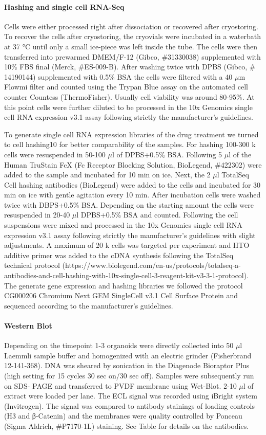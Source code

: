 \paragraph{Hashing and single cell RNA-Seq}
Cells were either processed right after dissociation or recovered after cryostoring.  To recover the cells after cryostoring, the cryovials were incubated in a waterbath at 37 °C until only a small ice-piece was left inside the tube. The cells were then transferred into prewarmed DMEM/F-12 (Gibco, \#31330038) supplemented with 10\% FBS final (Merck, \#ES-009-B). After washing twice with DPBS (Gibco, \# 14190144) supplemented with 0.5\% BSA the cells were filtered with a 40 $\mu$m Flowmi filter and counted using the Trypan Blue assay on the automated cell counter Countess (ThermoFisher). Usually cell viability was around 80-95\%. At this point cells were further diluted to be processed in the 10x Genomics single cell RNA expression v3.1 assay following strictly the manufacturer's guidelines.

To generate single cell RNA expression libraries of the drug treatment we turned to cell hashing10 for better comparability of the samples. For hashing 100-300 k cells were resuspended in 50-100 $\mu$l of DPBS+0.5\% BSA. Following 5 $\mu$l of the Human TruStain FcX (Fc Receptor Blocking Solution, BioLegend, \#422302) were added to the sample and incubated for 10 min on ice.  Next, the 2 $\mu$l TotalSeq Cell hashing antibodies (BioLegend) were added to the cells and incubated for 30 min on ice with gentle agitation every 10 min. After incubation cells were washed twice with DBPS+0.5\% BSA. Depending on the starting amount the cells were resuspended in 20-40 $\mu$l DPBS+0.5\% BSA and counted. Following the cell suspensions were mixed and processed in the 10x Genomics single cell RNA expression v3.1 assay following strictly the manufacturer's guidelines with slight adjustments. A maximum of 20 k cells was targeted per experiment and HTO additive primer was added to the cDNA synthesis following the TotalSeq technical protocol (https://www.biolegend.com/en-us/protocols/totalseq-a-antibodies-and-cell-hashing-with-10x-single-cell-3-reagent-kit-v3-3-1-protocol). The generate gene expression and hashing libraries we followed the protocol CG000206 Chromium Next GEM SingleCell v3.1 Cell Surface Protein and sequenced according to the manufacturer's guidelines.

\paragraph{Western Blot}
Depending on the timepoint 1-3 organoids were directly collected into 50 $\mu$l Laemmli sample buffer and homogenized with an electric grinder (Fisherbrand 12-141-368). DNA was sheared by sonication in the Diagenode Bioraptor Plus (high setting for 15 cycles 30 sec on/30 sec off). Samples were subsequently run on SDS- PAGE and transferred to PVDF membrane using Wet-Blot. 2-10 $\mu$l of extract were loaded per lane. The ECL signal was recorded using iBright system (Invitrogen). The signal was compared to antibody stainings of loading controls (H3 and β-Catenin) and the membranes were quality controlled by Ponceau (Sigma Aldrich, \#P7170-1L) staining. See Table for details on the antibodies.

